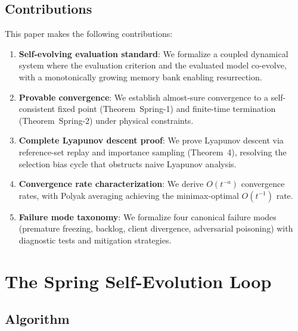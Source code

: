 \documentclass[11pt,a4paper]{article}
\theoremstyle{plain}
\theoremstyle{definition}
\theoremstyle{remark}
\begin{document}
\subsection{Contributions}

This paper makes the following contributions:

\begin{enumerate}[nosep]
    \item \textbf{Self-evolving evaluation standard}: We formalize a coupled dynamical system where the evaluation criterion and the evaluated model co-evolve, with a monotonically growing memory bank enabling resurrection.
    \item \textbf{Provable convergence}: We establish almost-sure convergence to a self-consistent fixed point (Theorem~Spring-1) and finite-time termination (Theorem~Spring-2) under physical constraints.
    \item \textbf{Complete Lyapunov descent proof}: We prove Lyapunov descent via reference-set replay and importance sampling (Theorem~4), resolving the selection bias cycle that obstructs naive Lyapunov analysis.
    \item \textbf{Convergence rate characterization}: We derive $O(t^{-a})$ convergence rates, with Polyak averaging achieving the minimax-optimal $O(t^{-1})$ rate.
    \item \textbf{Failure mode taxonomy}: We formalize four canonical failure modes (premature freezing, backlog, client divergence, adversarial poisoning) with diagnostic tests and mitigation strategies.
\end{enumerate}

\section{The Spring Self-Evolution Loop}

\subsection{Algorithm}
\end{document}
